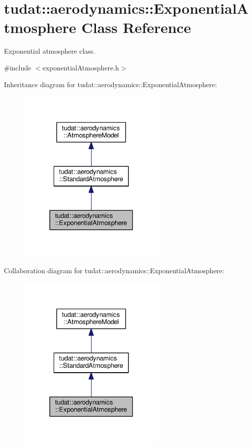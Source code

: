 \hypertarget{classtudat_1_1aerodynamics_1_1ExponentialAtmosphere}{}\section{tudat\+:\+:aerodynamics\+:\+:Exponential\+Atmosphere Class Reference}
\label{classtudat_1_1aerodynamics_1_1ExponentialAtmosphere}


Exponential atmosphere class.  




{\ttfamily \#include $<$exponential\+Atmosphere.\+h$>$}



Inheritance diagram for tudat\+:\+:aerodynamics\+:\+:Exponential\+Atmosphere\+:
\nopagebreak
\begin{figure}[H]
\begin{center}
\leavevmode
\includegraphics[width=206pt]{classtudat_1_1aerodynamics_1_1ExponentialAtmosphere__inherit__graph}
\end{center}
\end{figure}


Collaboration diagram for tudat\+:\+:aerodynamics\+:\+:Exponential\+Atmosphere\+:
\nopagebreak
\begin{figure}[H]
\begin{center}
\leavevmode
\includegraphics[width=206pt]{classtudat_1_1aerodynamics_1_1ExponentialAtmosphere__coll__graph}
\end{center}
\end{figure}
